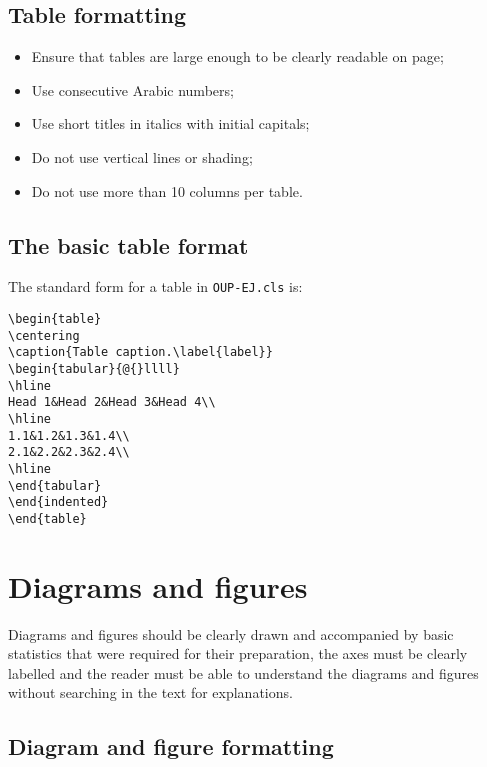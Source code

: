 \documentclass{OUP-EJ}
\begin{document}
\subsection{Table formatting}
\begin{itemize}
\item Ensure that tables are large enough to be clearly readable on page;
\item  Use consecutive Arabic numbers;
\item Use short titles in italics with initial capitals;
\item Do not use vertical lines or shading;
\item Do not use more than 10 columns per table.
\end{itemize}


\clearpage


\subsection{The basic table format}
The standard form for a table in \verb"OUP-EJ.cls" is:
\small\begin{verbatim}
\begin{table}
\centering
\caption{Table caption.\label{label}}
\begin{tabular}{@{}llll}
\hline
Head 1&Head 2&Head 3&Head 4\\
\hline
1.1&1.2&1.3&1.4\\
2.1&2.2&2.3&2.4\\
\hline
\end{tabular}
\end{indented}
\end{table}
\end{verbatim}\normalsize


\section{Diagrams and figures}
Diagrams and figures should be clearly drawn and accompanied by basic statistics that
were required for their preparation, the axes must be clearly labelled and the reader must be
able to understand the diagrams and figures without searching in the text for explanations.


\subsection{Diagram and figure formatting}
\end{document}
